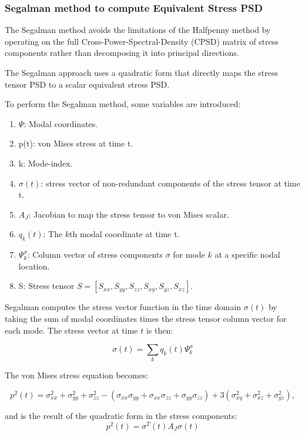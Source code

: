 \documentclass[a4paper,twoside]{bth}
\begin{document}
\subsubsection{Segalman method to compute Equivalent Stress PSD}
The Segalman method avoids the limitations of the Halfpenny method by operating on the full Cross-Power-Spectral-Density (CPSD) matrix of stress components rather than decomposing it into principal directions.

The Segalman approach uses a quadratic form that directly maps the stress tensor \ac{PSD} to a scalar equivalent stress \ac{PSD}.

To perform the Segalman method, some variables are introduced:
\begin{enumerate}
    \item $\Psi$: Modal coordinates.
    \item p(t): von Mises stress at time t.
    \item k: Mode-index.
    \item $\sigma(t)$: stress vector of non-redundant components of the stress tensor at time t.
    \item $A_J$: Jacobian to map the stress tensor to von Mises scalar.
    \item $q_k(t)$: The $k$th modal coordinate at time t.
    \item $\Psi_k^\sigma$: Column vector of stress components $\sigma$ for mode $k$ at a specific nodal location.
    \item S: Stress tensor $S = [S_{xx}, S_{yy}, S_{zz}, S_{xy}, S_{yz}, S_{xz}]$.
\end{enumerate}

Segalman computes the stress vector function in the time domain $\sigma(t)$ by taking the sum of modal coordinates times the stress tensor column vector for each mode. The stress vector at time $t$ is then:

\begin{equation}
    \sigma(t) = \sum_k q_k(t) \Psi^\sigma_k
\end{equation}

The von Mises stress equation becomes:

\begin{equation} \label{eq:SegalmanVM}
    p^2(t) = \sigma_{xx}^2+\sigma_{yy}^2 + \sigma_{zz}^2 - (\sigma_{xx}\sigma_{yy}+\sigma_{xx}\sigma_{zz}+\sigma_{yy}\sigma_{zz}) + 3(\sigma_{xy}^2+\sigma_{xz}^2+\sigma_{yz}^2),
\end{equation}

and is the result of the quadratic form in the stress components:
\begin{equation}
p^2(t) = \sigma^T(t) A_J \sigma(t)
\end{equation}
\end{document}
